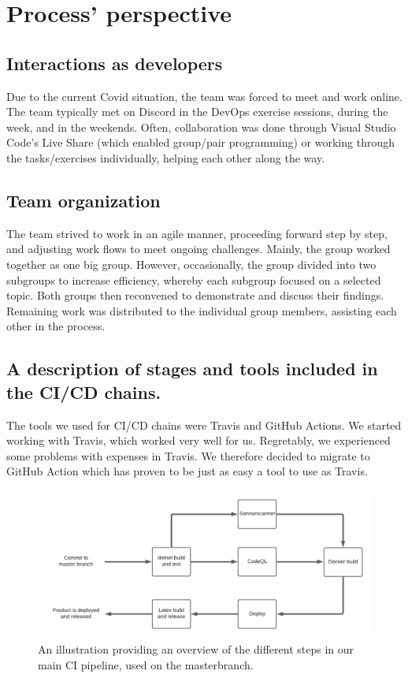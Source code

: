 \section{Process' perspective}

\subsection{Interactions as developers}
Due to the current Covid situation, the team was forced to meet and work online. 
The team typically met on Discord in the DevOps exercise sessions, during the week, and in the weekends. 
Often, collaboration was done through Visual Studio Code's Live Share (which enabled group/pair programming) 
or working through the tasks/exercises individually, helping each other along the way. 
\newline
 
\subsection{Team organization}
The team strived to work in an agile manner, proceeding forward step by step, and adjusting work flows to meet ongoing challenges. 
Mainly, the group worked together as one big group. 
However, occasionally, the group divided into two subgroups to increase efficiency, whereby each subgroup focused on a selected topic. 
Both groups then reconvened to demonstrate and discuss their findings. 
Remaining work was distributed to the individual group members, assisting each other in the process.
  
\subsection{A description of stages and tools included in the CI/CD chains.}%
The tools we used for CI/CD chains were Travis and GitHub Actions. 
We started working with Travis, which worked very well for us. 
Regretably, we experienced some problems with expenses in Travis.
We therefore decided to migrate to GitHub Action which has proven to be just as easy a tool to use as Travis.

\begin{figure}[h!]
    \centering
    \includegraphics[scale=0.7]{images/CIpipelinediagram.png}
    \caption{An illustration providing an overview of the different steps in our main CI pipeline, used on the masterbranch. }
\end{figure}

